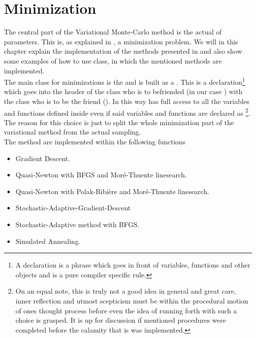 \section{Minimization}
    The central part of the Variational Monte-Carlo method is the actual
     of parameters. This is, as explained in ,
    a minimization problem. We will in this chapter explain the implementation
    of the methods presented in  and also show some examples of
    how to use  class, in which the mentioned methods are
    implemented. \\
    The main class for minimizations is the  and is built
    as a . This is a \CC declaration\footnote{A \CC
    declaration is a phrase which goes in front of variables, functions and
    other objects and is a pure compiler specific rule.} which goes into the
    header of the class who is to befriended (in our case ) with
    the class who is to be the friend (). In this way
     has full access to all the variables and functions
    defined inside  even if said variables and functions are
    declared as \footnote{On an equal note, this is truly not a
    good idea in general and great care, inner reflection and utmost scepticism
    must be within the procedural motion of ones thought process before even
    the idea of running forth with such a choice is grasped. It is up for
    discussion if mentioned procedures were completed before the calamity that
    is  was implemented.}. The reason for this choice is
    just to split the whole minimization part of the variational method from
    the actual sampling. \\
    The method are implemented within the following functions
        \begin{itemize}
            \item{ Gradient Descent.}
            \item{ Quasi-Newton with BFGS and Mor\'e-Thuente linesearch.}
            \item{ Quasi-Newton with Polak-Ribi\`ere and Mor\'e-Thuente linesearch.}
            \item{ Stochastic-Adaptive-Gradient-Descent}
            \item{ Stochastic-Adaptive method with BFGS.}
            \item{ Simulated Annealing.}
        \end{itemize}
